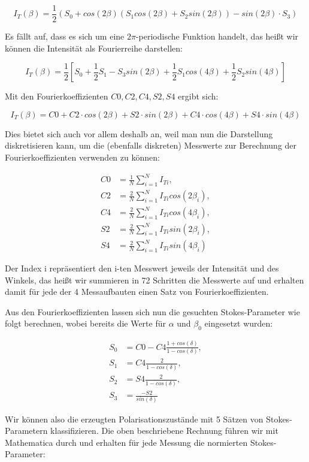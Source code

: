 \documentclass[bigchapter,colorback,accentcolor=tud4b,linedtoc,11pt]{tudreport}
\begin{document}
$$I_T(\beta) = \frac{1}{2} (S_0 + cos(2 \beta) (S_1 cos(2 \beta) + S_2 sin(2 \beta)) - sin(2 \beta) \cdot S_3 )$$

Es fällt auf, dass es sich um eine $2 \pi$-periodische Funktion handelt, das heißt wir können die Intensität als Fourierreihe darstellen: 

$$I_T(\beta) = \frac{1}{2} [S_0 + \frac{1}{2} S_1 - S_3 sin(2 \beta) + \frac{1}{2} S_1 cos(4 \beta) + \frac{1}{2} S_2 sin(4 \beta)]$$

Mit den Fourierkoeffizienten $C0, C2, C4, S2, S4$ ergibt sich: 

$$I_T(\beta) = C0 + C2 \cdot cos(2 \beta) + S2 \cdot sin (2 \beta) + C4 \cdot cos (4 \beta) + S4 \cdot sin (4 \beta)$$

Dies bietet sich auch vor allem deshalb an, weil man nun die Darstellung diskretisieren kann, um die (ebenfalls diskreten) Messwerte zur Berechnung der Fourierkoeffizienten verwenden zu können:

\begin{align*}
 C0 &= \frac{1}{N} \sum_{i=1}^N I_{Ti},\\
 C2 &= \frac{2}{N} \sum_{i=1}^N I_{Ti} cos(2 \beta_i),\\
 C4 &= \frac{2}{N} \sum_{i=1}^N I_{Ti} cos(4 \beta_i),\\
 S2 &= \frac{2}{N} \sum_{i=1}^N I_{Ti} sin(2 \beta_i),\\
 S4 &= \frac{2}{N} \sum_{i=1}^N I_{Ti} sin(4 \beta_i)
\end{align*}

Der Index i repräsentiert den i-ten Messwert jeweils der Intensität und des Winkels, das heißt wir summieren in 72 Schritten die Messwerte auf und erhalten damit für jede der 4 Messaufbauten einen Satz von Fourierkoeffizienten.

Aus den Fourierkoeffizienten lassen sich nun die gesuchten Stokes-Parameter wie folgt berechnen, wobei bereits die Werte für $\alpha$ und $\beta_0$ eingesetzt wurden: 

\begin{align*}
 S_0 &= C0 - C4 \frac{1 + cos(\delta)}{1 - cos(\delta)},\\ 
 S_1 &= C4 \frac{2}{1 - cos(\delta)},\\
 S_2 &= S4 \frac{2}{1 - cos(\delta)},\\
 S_3 &= \frac{-S2}{sin(\delta)} 
\end{align*}

Wir können also die erzeugten Polarisationszustände mit 5 Sätzen von Stokes-Parametern klassifizieren. Die oben beschriebene Rechnung führen wir mit Mathematica durch und erhalten für jede Messung die normierten Stokes-Parameter:
\end{document}

